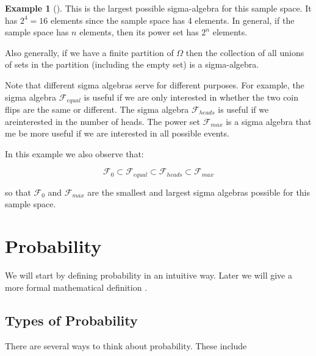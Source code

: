 \documentclass[
  letterpaper,
  DIV=11,
  numbers=noendperiod]{scrreport}
\theoremstyle{definition}
\newtheorem{example}{Example}[chapter]
\theoremstyle{plain}
\theoremstyle{plain}
\theoremstyle{definition}
\theoremstyle{remark}
\begin{document}
\begin{tcolorbox}
\begin{example}[]
This is the largest possible sigma-algebra for this sample space. It has
\(2^4=16\) elements since the sample space has 4 elements. In general,
if the sample space has \(n\) elements, then its power set has \(2^n\)
elements.

Also generally, if we have a finite partition of \(\Omega\) then the
collection of all unions of sets in the partition (including the empty
set) is a sigma-algebra.

Note that different sigma algebras serve for different purposes. For
example, the sigma algebra \(\mathcal F_{equal}\) is useful if we are
only interested in whether the two coin flips are the same or different.
The sigma algebra \(\mathcal F_{heads}\) is useful if we areinterested
in the number of heads. The power set \(\mathcal F_{max}\) is a sigma
algebra that me be more useful if we are interested in all possible
events.

In this example we also observe that:

\[
\mathcal F_0 \subset \mathcal F_{equal}
\subset \mathcal F_{heads}
\subset \mathcal F_{max}
\]

so that \(\mathcal F_0\) and \(\mathcal F_{max}\) are the smallest and
largest sigma algebras possible for this sample space.

\end{example}

\end{tcolorbox}

\section{Probability}\label{probability}

We will start by defining probability in an intuitive way. Later we will
give a more formal mathematical definition .

\subsection{Types of Probability}\label{types-of-probability}

There are several ways to think about probability. These include
\end{document}

